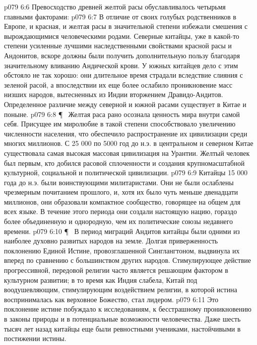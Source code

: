 \vs p079 6:6 Превосходство древней желтой расы обуславливалось четырьмя главными факторами:
\vs p079 6:7 \bibnobreakspace {} В отличие от своих голубых родственников в Европе, и красная, и желтая расы в значительной степени избежали смешения с вырождающимися человеческими родами. Северные китайцы, уже в какой\hyp{}то степени усиленные лучшими наследственными свойствами красной расы и Андонитов, вскоре должны были получить дополнительную пользу благодаря значительному вливанию Андической крови. У южных китайцев дело с этим обстояло не так хорошо: они длительное время страдали вследствие слияния с зеленой расой, а впоследствии их еще более ослабило проникновение масс низших народов, вытесненных из Индии вторжением Дравидо\hyp{}Андитов. Определенное различие между северной и южной расами существует в Китае и поныне.
\vs p079 6:8 \P\ \bibnobreakspace {} Желтая раса рано осознала ценность мира внутри самой себя. Присущее им миролюбие в такой степени способствовало увеличению численности населения, что обеспечило распространение их цивилизации среди многих миллионов. С 25 000 по 5000 год до н.э. в центральном и северном Китае существовала самая высокая массовая цивилизация на Урантии. Желтый человек был первым, кто добился расовой сплоченности и создания крупномасштабной культурной, социальной и политической цивилизации.
\vs p079 6:9 Китайцы 15 000 года до н.э. были воинствующими милитаристами. Они не были ослаблены чрезмерным почитанием прошлого, и, хотя их было чуть меньше двенадцати миллионов, они образовали компактное сообщество, говорящее на общем для всех языке. В течение этого периода они создали настоящую нацию, гораздо более объединенную и однородную, чем их политические союзы недавнего времени.
\vs p079 6:10 \P\ \bibnobreakspace {} В период миграций Андитов китайцы были одними из наиболее духовно развитых народов на земле. Долгая приверженность поклонению Единой Истине, провозглашенной Синглангтоном, выдвинула их вперед по сравнению с большинством других народов. Стимулирующее действие прогрессивной, передовой религии часто является решающим фактором в культурном развитии; в то время как Индия слабела, Китай под воодушевляющим, стимулирующим воздействием религии, в которой истина воспринималась как верховное Божество, стал лидером.
\vs p079 6:11 Это поклонение истине побуждало к исследованиям, к бесстрашному проникновению в законы природы и в потенциальные возможности человечества. Даже шесть тысяч лет назад китайцы еще были ревностными учениками, настойчивыми в постижении истины.
